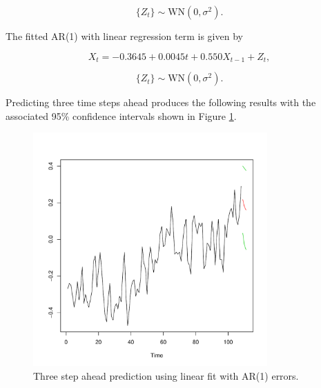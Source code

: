 \documentclass[12pt]{article}
\newenvironment{solution}[2][Solution]{\begin{trivlist}
	\item[\hskip \labelsep {\bfseries #1}]}{\end{trivlist}}
\begin{document}
\begin{solution}{}
	\begin{equation*}
	\{Z_t\} \sim \text{WN}(0,\sigma^2).
	\end{equation*}
	
	The fitted AR(1) with linear regression term is given by 
	
	\begin{equation*}
	X_t = -0.3645 + 0.0045t +0.550 X_{t-1} + Z_t,
	\end{equation*}
	
	\begin{equation*}
	\{Z_t\} \sim \text{WN}(0,\sigma^2).
	\end{equation*}
	
	 
	Predicting three time steps ahead produces the following results with the associated 95\% confidence intervals shown in Figure \ref{fig:temp_pred}.
	
	
	\begin{figure}[H]
    		\centering
    		\includegraphics[width=0.8\textwidth]{figs/problem_6/temp_arima_pred.pdf}
    		\caption{Three step ahead prediction using linear fit with AR(1) errors.}
    		\label{fig:temp_pred}
	\end{figure}
	
	\newpage
	\end{solution}

	\newpage
	
\end{document}
